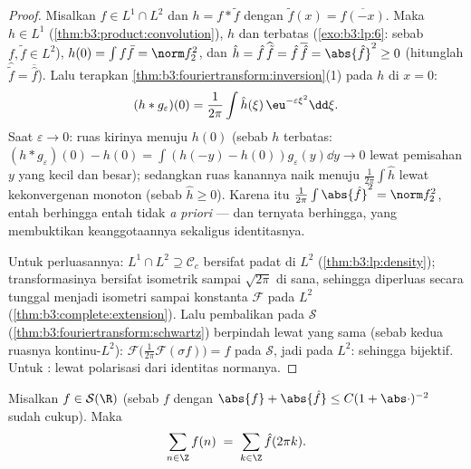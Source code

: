\begin{proof}
Misalkan $f \in L^1\cap L^2$ dan $h = f * \tilde f$ dengan
$\tilde f(x) = \overline{f(-x)}$. Maka $h \in L^1$
(\cref{thm:b3:product:convolution}), $h$  dan
terbatas (\cref{exo:b3:lp:6}: sebab $f, \tilde f \in L^2$), $h(0) =
\int f\bar f = \norm f_2^2$, dan $\hat h = \hat
f\,\widehat{\tilde f} = \hat f\,\overline{\hat f} =
\abs{\hat f}^2 \geq 0$ (hitunglah $\widehat{\tilde f} =
\overline{\hat f}$). Lalu terapkan
\cref{thm:b3:fouriertransform:inversion}(1) pada $h$ di $x = 0$:
\[
(h * g_\varepsilon)(0) = \frac1{2\pi}\int \hat
h(\xi)\,\eu^{-\varepsilon\xi^2}\dd\xi .
\]
Saat $\varepsilon \to 0$: ruas kirinya menuju $h(0)$ (sebab $h$
 terbatas: $(h*g_\varepsilon)(0) - h(0) = \int(h(-y)
- h(0))g_\varepsilon(y)\dd y \to 0$ lewat pemisahan $y$ yang kecil
dan besar); sedangkan ruas kanannya naik menuju $\frac1{2\pi}\int\hat h$ lewat
kekonvergenan monoton (sebab $\hat h \geq 0$). Karena itu $\frac1{2\pi}\int\abs{\hat f}^2 =
\norm f_2^2$, entah berhingga entah tidak \emph{a priori} --- dan ternyata berhingga,
yang membuktikan keanggotaannya sekaligus identitasnya.

Untuk perluasannya: $L^1\cap L^2 \supseteq \mathcal C_c$ bersifat padat di
$L^2$ (\cref{thm:b3:lp:density}); transformasinya bersifat
isometrik sampai $\sqrt{2\pi}$ di sana, sehingga diperluas secara tunggal menjadi
isometri sampai konstanta $\mathcal F$ pada $L^2$
(\cref{thm:b3:complete:extension}). Lalu pembalikan pada $\mathcal S$
(\cref{thm:b3:fouriertransform:schwartz}) berpindah lewat
 yang sama (sebab kedua ruasnya kontinu-$L^2$): $\mathcal
F\bigl(\frac1{2\pi}\mathcal F(\sigma f)\bigr) = f$ pada
$\mathcal S$, jadi pada $L^2$: sehingga bijektif. Untuk :
lewat polarisasi dari identitas normanya.
\end{proof}

\begin{theorem}
\label{thm:b3:fouriertransform:poisson}
Misalkan $f \in \mathcal S(\R)$ (sebab $f$  dengan $\abs{f} +
\abs{\hat f} \leq C(1 + \abs\cdot)^{-2}$
sudah cukup). Maka
\[
\sum_{n\in\Z} f(n) \;=\; \sum_{k\in\Z}\hat f(2\pi k) .
\]
\end{theorem}

